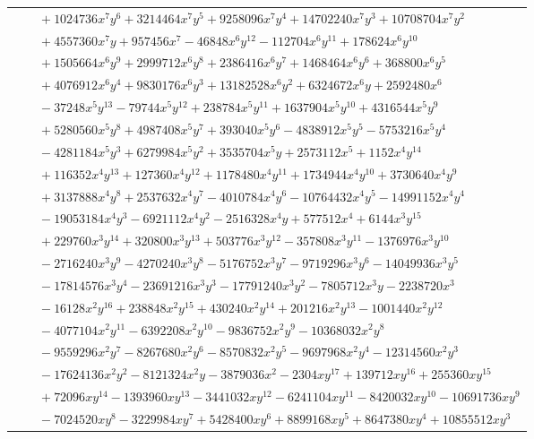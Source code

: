 \documentclass[11pt]{article}
\begin{document}
\begin{longtable}{@{}ll@{}}
 & $\quad +1024736x^{7}y^{6}+3214464x^{7}y^{5}+9258096x^{7}y^{4}+14702240x^{7}y^{3}+10708704x^{7}y^{2}$\\
 & $\quad +4557360x^{7}y+957456x^{7}-46848x^{6}y^{12}-112704x^{6}y^{11}+178624x^{6}y^{10}$\\
 & $\quad +1505664x^{6}y^{9}+2999712x^{6}y^{8}+2386416x^{6}y^{7}+1468464x^{6}y^{6}+368800x^{6}y^{5}$\\
 & $\quad +4076912x^{6}y^{4}+9830176x^{6}y^{3}+13182528x^{6}y^{2}+6324672x^{6}y+2592480x^{6}$\\
 & $\quad -37248x^{5}y^{13}-79744x^{5}y^{12}+238784x^{5}y^{11}+1637904x^{5}y^{10}+4316544x^{5}y^{9}$\\
 & $\quad +5280560x^{5}y^{8}+4987408x^{5}y^{7}+393040x^{5}y^{6}-4838912x^{5}y^{5}-5753216x^{5}y^{4}$\\
 & $\quad -4281184x^{5}y^{3}+6279984x^{5}y^{2}+3535704x^{5}y+2573112x^{5}+1152x^{4}y^{14}$\\
 & $\quad +116352x^{4}y^{13}+127360x^{4}y^{12}+1178480x^{4}y^{11}+1734944x^{4}y^{10}+3730640x^{4}y^{9}$\\
 & $\quad +3137888x^{4}y^{8}+2537632x^{4}y^{7}-4010784x^{4}y^{6}-10764432x^{4}y^{5}-14991152x^{4}y^{4}$\\
 & $\quad -19053184x^{4}y^{3}-6921112x^{4}y^{2}-2516328x^{4}y+577512x^{4}+6144x^{3}y^{15}$\\
 & $\quad +229760x^{3}y^{14}+320800x^{3}y^{13}+503776x^{3}y^{12}-357808x^{3}y^{11}-1376976x^{3}y^{10}$\\
 & $\quad -2716240x^{3}y^{9}-4270240x^{3}y^{8}-5176752x^{3}y^{7}-9719296x^{3}y^{6}-14049936x^{3}y^{5}$\\
 & $\quad -17814576x^{3}y^{4}-23691216x^{3}y^{3}-17791240x^{3}y^{2}-7805712x^{3}y-2238720x^{3}$\\
 & $\quad -16128x^{2}y^{16}+238848x^{2}y^{15}+430240x^{2}y^{14}+201216x^{2}y^{13}-1001440x^{2}y^{12}$\\
 & $\quad -4077104x^{2}y^{11}-6392208x^{2}y^{10}-9836752x^{2}y^{9}-10368032x^{2}y^{8}$\\
 & $\quad -9559296x^{2}y^{7}-8267680x^{2}y^{6}-8570832x^{2}y^{5}-9697968x^{2}y^{4}-12314560x^{2}y^{3}$\\
 & $\quad -17624136x^{2}y^{2}-8121324x^{2}y-3879036x^{2}-2304xy^{17}+139712xy^{16}+255360xy^{15}$\\
 & $\quad +72096xy^{14}-1393960xy^{13}-3441032xy^{12}-6241104xy^{11}-8420032xy^{10}-10691736xy^{9}$\\
 & $\quad -7024520xy^{8}-3229984xy^{7}+5428400xy^{6}+8899168xy^{5}+8647380xy^{4}+10855512xy^{3}$\\

\end{longtable}
\end{document}
